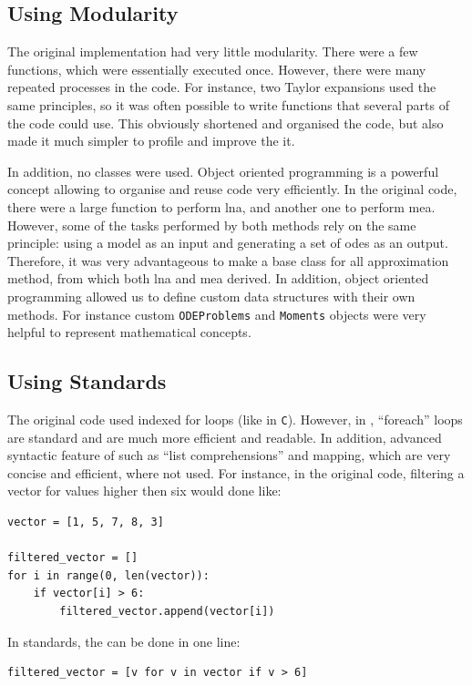 \subsection{Using Modularity}

The original implementation had very little modularity.
There were a few functions, which were essentially executed once.
However, there were many repeated processes in the code.
For instance, two Taylor expansions used the same principles,
so it was often possible to write functions that several parts of the code could use.
This obviously shortened and organised the code, but also made it much simpler to profile and improve the it.
 
In addition, no classes were used.
Object oriented programming is a powerful concept allowing to organise and reuse code very efficiently.
In the original code, there were a large function to perform \gls{lna}, and another one to perform \gls{mea}.
However, some of the tasks performed by both methods rely on the same principle: using a model as an input and generating a set of \glspl{ode} as an output.
Therefore, it was very advantageous to make a base class for all approximation method, from which both \gls{lna} and \gls{mea} derived.
In addition, object oriented programming allowed us to define custom data structures with their own methods.
For instance custom \texttt{ODEProblems} and \texttt{Moments} objects were very helpful to represent mathematical concepts.

\subsection{Using \py{} Standards}
The original code used indexed for loops (like in \texttt{C}).
However, in \py, ``foreach'' loops are  standard and are much more efficient and readable.
In addition, advanced syntactic feature of \py{} such as ``list comprehensions''  and mapping,
which are very concise and efficient, where not used.
For instance, in the original code, filtering a vector for values higher then six would done like:

\begin{verbatim}
vector = [1, 5, 7, 8, 3]

filtered_vector = []
for i in range(0, len(vector)):
    if vector[i] > 6:
        filtered_vector.append(vector[i])
\end{verbatim}

In \py{} standards, the can be done in one line:

\begin{verbatim}
filtered_vector = [v for v in vector if v > 6]
\end{verbatim}

